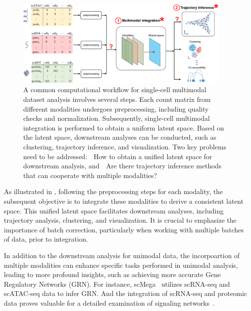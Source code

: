 \begin{figure}[!ht]
	\centering
	\includegraphics[width=0.95\textwidth]{workflow_multimodal/fig}
	\vspace{0.1cm}
	\caption[A common computational multimodal analysis workflow.]{A common computational workflow for single-cell multimodal dataset analysis involves several steps. Each count matrix from different modalities undergoes preprocessing, including quality checks and normalization. Subsequently, single-cell multimodal integration is performed to obtain a uniform latent space. Based on the latent space, downstream analyses can be conducted, such as clustering, trajectory inference, and visualization. Two key problems need to be addressed: \textcircled{} How to obtain a unified latent space for downstream analysis, and \textcircled{} Are there trajectory inference methods that can cooperate with multiple modalities?}
	\label{fig:workflow_multimodal}
\end{figure}


	As illustrated in , following the preprocessing steps for each modality, the subsequent objective is to integrate these modalities to derive a consistent latent space. This unified latent space facilitates downstream analyses, including trajectory analysis, clustering, and visualization. It is crucial to emphasize the importance of batch correction, particularly when working with multiple batches of data, prior to integration.

	In addition to the downstream analysis for unimodal data, the incorpoartion of multiple modalities can enhance specific tasks performed in unimodal analysis, leading to more profound insights, such as achieving more accurate Gene Regulatory Networks (GRN). For instance, scMega~\citep{li2023scmega} utilizes scRNA-seq and scATAC-seq data to infer GRN. And the integration of scRNA-seq and proteomic data proves valuable for a detailed examination of signaling networks~\citep{heumos2023best}.


